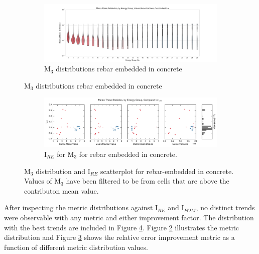 \begin{figure}[htb!]
  \centering
  \begin{subfigure}[t]{\textwidth}
    \includegraphics[width=\linewidth]{./chapters/characterization_probs/figures/char/prob_4/metric_three_violin_mean.pdf}
    \caption{M$_3$ distributions rebar embedded in concrete}
    \label{fig:M3violinrebar}
  \end{subfigure}
\end{figure}
\begin{figure}[htb!]\ContinuedFloat
  \centering
  \begin{subfigure}[t]{\textwidth}
    \includegraphics[width=\linewidth]{./chapters/characterization_probs/figures/char/prob_4/metric_three_err_stats_mean.pdf}
    \caption{I$_{RE}$ for M$_3$ for rebar embedded in concrete.}
    \label{fig:M3statsrebar}
  \end{subfigure}
  \caption[M$_3$ distribution and trends for rebar-embedded concrete
  problem.]{M$_3$ distribution and I$_{RE}$ scatterplot for rebar-embedded in
concrete. Values of M$_3$ have been filtered to be from cells that are above the
contributon mean value.}
  \label{fig:rebarplots}
\end{figure}

After inspecting the metric distributions against I$_{RE}$ and I$_{FOM}$, no
distinct trends were observable with any metric and either improvement factor.
The distribution with the best trends are included in Figure
\ref{fig:rebarplots}. Figure \ref{fig:M3violinrebar} illustrates the
metric distribution and Figure \ref{fig:M3statsrebar} shows the relative error
improvement metric as a function of different metric distribution values.

